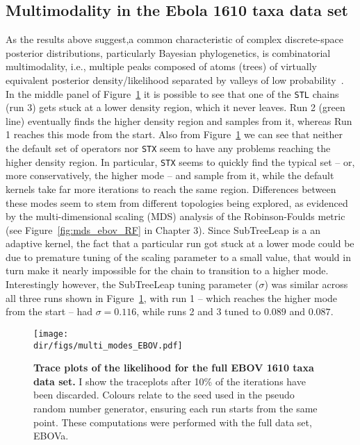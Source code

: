 \subsection{Multimodality in the Ebola 1610 taxa data set}
\label{sec:multimod}

As the results above suggest,a common characteristic of complex discrete-space posterior distributions, particularly Bayesian phylogenetics, is combinatorial multimodality, i.e., multiple peaks composed of atoms (trees) of virtually equivalent posterior density/likelihood separated by valleys of low probability~\citep{Lakner2008,Whidden2015}.
In the middle panel of Figure~\ref{fig:ebovmultimod} it is possible to see that one of the \verb|STL| chains (run 3) gets stuck at a lower density region, which it never leaves.
Run 2 (green line) eventually finds the higher density region and samples from it, whereas Run 1 reaches this mode from the start.
Also from Figure~\ref{fig:ebovmultimod} we can see that neither the default set of operators nor \verb|STX| seem to have any problems reaching the higher density region.
In particular, \verb|STX| seems to quickly find the typical set -- or, more conservatively, the higher mode -- and sample from it, while the default kernels take far more iterations to reach the same region.
Differences between these modes seem to stem from different topologies being explored, as evidenced by the multi-dimensional scaling (MDS) analysis of the Robinson-Foulds metric (see Figure~\ref{fig:mds_ebov_RF} in Chapter 3).
Since SubTreeLeap is a an adaptive kernel, the fact that a particular run got stuck at a lower mode could be due to premature tuning of the scaling parameter to a small value, that would in turn make it nearly impossible for the chain to transition to a higher mode.  
Interestingly however, the SubTreeLeap tuning parameter ($\sigma$) was similar across all three runs shown in Figure~\ref{fig:ebovmultimod}, with run 1 -- which reaches the higher mode from the start -- had $\sigma = 0.116$, while runs 2 and 3 tuned to $0.089$ and $0.087$.

\begin{figure}[!ht]
\begin{center}
\texttt{[image: \\dir/figs/multi\_modes\_EBOV.pdf]} 
\end{center}
 \caption[Trace plots of the likelihood for the full EBOV 1610 taxa data set.]{\textbf{Trace plots of the likelihood for the full EBOV 1610 taxa data set.}
 I show the traceplots after 10\% of the iterations have been discarded.
 Colours relate to the seed used in the pseudo random number generator, ensuring each run starts from the same point. 
 These computations were performed with the full data set, EBOVa.
 }
 \label{fig:ebovmultimod}
\end{figure}

